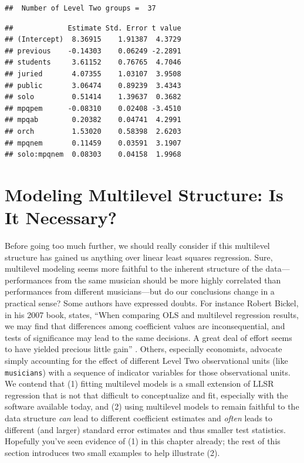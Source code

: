 \documentclass[
]{krantz}
\begin{document}
\begin{verbatim}
##  Number of Level Two groups =  37
\end{verbatim}

\begin{verbatim}
##             Estimate Std. Error t value
## (Intercept)  8.36915    1.91387  4.3729
## previous    -0.14303    0.06249 -2.2891
## students     3.61152    0.76765  4.7046
## juried       4.07355    1.03107  3.9508
## public       3.06474    0.89239  3.4343
## solo         0.51414    1.39637  0.3682
## mpqpem      -0.08310    0.02408 -3.4510
## mpqab        0.20382    0.04741  4.2991
## orch         1.53020    0.58398  2.6203
## mpqnem       0.11459    0.03591  3.1907
## solo:mpqnem  0.08303    0.04158  1.9968
\end{verbatim}

\section{Modeling Multilevel Structure: Is It Necessary?}\label{multinecessary}

Before going too much further, we should really consider if this multilevel structure has gained us anything over linear least squares regression.  Sure, multilevel modeling  seems more faithful to the inherent structure of the data---performances from the same musician should be more highly correlated than performances from different musicians---but do our conclusions change in a practical sense? Some authors have expressed doubts. For instance Robert Bickel, in his 2007 book, states, ``When comparing OLS and multilevel regression results, we may find that differences among coefficient values are inconsequential, and tests of significance may lead to the same decisions. A great deal of effort seems to have yielded precious little gain'' \citep{Bickel2007}. Others, especially economists, advocate simply accounting for the effect of different Level Two observational units (like \texttt{musicians}) with a sequence of indicator variables for those observational units. We contend that (1) fitting multilevel models is a small extension of LLSR regression that is not that difficult to conceptualize and fit, especially with the software available today, and (2) using multilevel models to remain faithful to the data structure \emph{can} lead to different coefficient estimates and \emph{often} leads to different (and larger) standard error estimates and thus smaller test statistics. Hopefully you've seen evidence of (1) in this chapter already; the rest of this section introduces two small examples to help illustrate (2).
\end{document}
